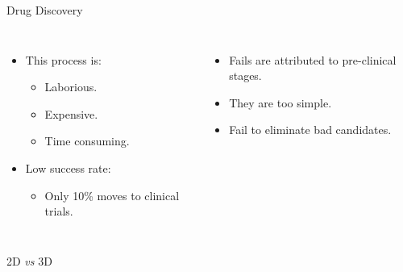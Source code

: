 \begin{frame}{Drug Discovery}
    \begin{columns}
            \begin{itemize}
                \item<1-> This process is:
                \begin{itemize}
                    \item<2-> Laborious.
                    \item<3-> Expensive.
                    \item<4-> Time consuming.
                \end{itemize}
                \item<5-> Low success rate:
                \begin{itemize}
                    \item<6-> Only \alert{10\%} moves to clinical trials.
                \end{itemize}
            \end{itemize}
            \begin{itemize}
                \item<7-> Fails are attributed to \alert{pre-clinical} stages.
                \item<8-> They are too simple.
                \item<9-> Fail to eliminate bad candidates.
            \end{itemize}
    \end{columns}
\end{frame}

\begin{frame}{2D \textit{vs} 3D}
    \begin{figure}[!htb]
    \centering
     \hspace*{0.3cm}
     \hspace*{0.3cm}
    \label{fig:2d_vs_3d}
    \end{figure}
\end{frame}

